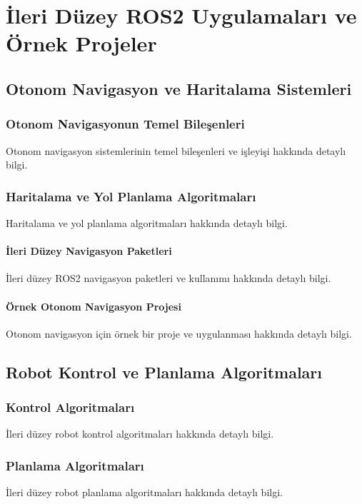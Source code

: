 \chapter{İleri Düzey ROS2 Uygulamaları ve Örnek Projeler}

\section{Otonom Navigasyon ve Haritalama Sistemleri}
\subsection{Otonom Navigasyonun Temel Bileşenleri}
Otonom navigasyon sistemlerinin temel bileşenleri ve işleyişi hakkında detaylı bilgi.

\subsection{Haritalama ve Yol Planlama Algoritmaları}
Haritalama ve yol planlama algoritmaları hakkında detaylı bilgi.

\subsubsection{İleri Düzey Navigasyon Paketleri}
İleri düzey ROS2 navigasyon paketleri ve kullanımı hakkında detaylı bilgi.

\subsubsection{Örnek Otonom Navigasyon Projesi}
Otonom navigasyon için örnek bir proje ve uygulanması hakkında detaylı bilgi.

\section{Robot Kontrol ve Planlama Algoritmaları}
\subsection{Kontrol Algoritmaları}
İleri düzey robot kontrol algoritmaları hakkında detaylı bilgi.

\subsection{Planlama Algoritmaları}
İleri düzey robot planlama algoritmaları hakkında detaylı bilgi.

